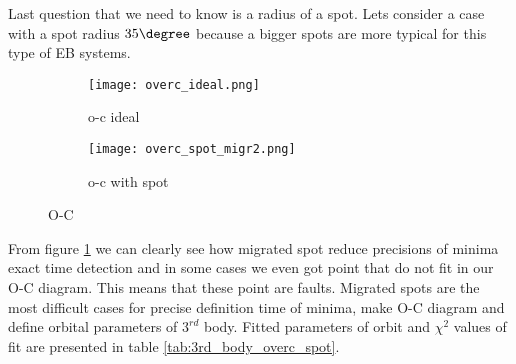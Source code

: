 Last question that we need to know is a radius of a spot. Lets consider a case with a spot radius $35\degree$ because a bigger spots are more typical for this type of EB systems. 

 
\begin{figure}[!h]
    \centering
    \begin{subfigure}[t]{0.5\textwidth}
        \centering
        \texttt{[image: overc\_ideal.png]}
        \caption{o-c ideal}
    \end{subfigure}%
    \begin{subfigure}[t]{0.5\textwidth}
        \centering
        \texttt{[image: overc\_spot\_migr2.png]}
        \caption{o-c with spot}
    \end{subfigure}
    \caption{O-C}
\label{fig:overcontact_spot_oc}
\end{figure}

From figure \ref{fig:overcontact_spot_oc} we can clearly see how migrated spot reduce precisions of minima exact time detection and in some cases we even got point that do not fit in our O-C diagram. This means that these point are faults. Migrated spots are the most difficult cases for precise definition time of minima, make O-C diagram and define orbital parameters of $3^{rd}$ body.
Fitted parameters of orbit and $\chi^2$ values of fit are presented in table \ref{tab:3rd_body_overc_spot}. 
  
